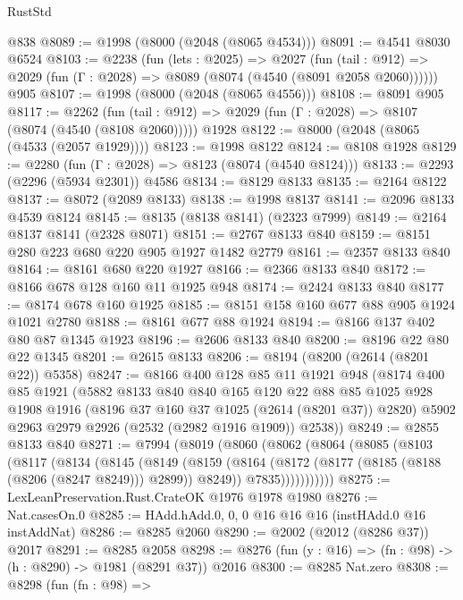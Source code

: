 \begin{lexlean}{RustStd}
\begin{coremodule}
    @838
@8089 := @1998 (@8000 (@2048 (@8065 @4534)))
@8091 := @4541 @8030 @6524
@8103 := @2238
    (fun (lets : @2025) =>
    @2027
      (fun (tail : @912) => @2029 (fun (Γ : @2028) => @8089 (@8074 (@4540 (@8091 @2058 @2060))))))
    @905
@8107 := @1998 (@8000 (@2048 (@8065 @4556)))
@8108 := @8091 @905
@8117 := @2262
    (fun (tail : @912) => @2029 (fun (Γ : @2028) => @8107 (@8074 (@4540 (@8108 @2060)))))
    @1928
@8122 := @8000 (@2048 (@8065 (@4533 (@2057 @1929))))
@8123 := @1998 @8122
@8124 := @8108 @1928
@8129 := @2280 (fun (Γ : @2028) => @8123 (@8074 (@4540 @8124)))
@8133 := @2293 (@2296 (@5934 @2301)) @4586
@8134 := @8129 @8133
@8135 := @2164 @8122
@8137 := @8072 (@2089 @8133)
@8138 := @1998 @8137
@8141 := @2096 @8133 @4539 @8124
@8145 := @8135 (@8138 @8141) (@2323 @7999)
@8149 := @2164 @8137 @8141 (@2328 @8071)
@8151 := @2767 @8133 @840
@8159 := @8151 @280 @223 @680 @220 @905 @1927 @1482 @2779
@8161 := @2357 @8133 @840
@8164 := @8161 @680 @220 @1927
@8166 := @2366 @8133 @840
@8172 := @8166 @678 @128 @160 @11 @1925 @948
@8174 := @2424 @8133 @840
@8177 := @8174 @678 @160 @1925
@8185 := @8151 @158 @160 @677 @88 @905 @1924 @1021 @2780
@8188 := @8161 @677 @88 @1924
@8194 := @8166 @137 @402 @80 @87 @1345 @1923
@8196 := @2606 @8133 @840
@8200 := @8196 @22 @80 @22 @1345
@8201 := @2615 @8133
@8206 := @8194 (@8200 (@2614 (@8201 @22)) @5358)
@8247 := @8166
    @400
    @128
    @85
    @11
    @1921
    @948
    (@8174
      @400
      @85
      @1921
      (@5882
        @8133
        @840
        @840
        @165
        @120
        @22
        @88
        @85
        @1025
        @928
        @1908
        @1916
        (@8196 @37 @160 @37 @1025 (@2614 (@8201 @37)) @2820)
        @5902
        @2963
        @2979
        @2926
        (@2532 (@2982 @1916 @1909))
        @2538))
@8249 := @2855 @8133 @840
@8271 := @7994
    (@8019
      (@8060
        (@8062
          (@8064
            (@8085
              (@8103
                (@8117
                  (@8134
                    (@8145
                      (@8149
                        (@8159
                          (@8164 (@8172 (@8177 (@8185 (@8188 (@8206 (@8247 @8249))) @2899)) @8249))
                          @7835)))))))))))
@8275 := LexLeanPreservation.Rust.CrateOK @1976 @1978 @1980
@8276 := Nat.casesOn.{0}
@8285 := HAdd.hAdd.{0, 0, 0} @16 @16 @16 (instHAdd.{0} @16 instAddNat)
@8286 := @8285 @2060
@8290 := @2002 (@2012 (@8286 @37)) @2017
@8291 := @8285 @2058
@8298 := @8276 (fun (y : @16) => (fn : @98) -> (h : @8290) -> @1981 (@8291 @37)) @2016
@8300 := @8285 Nat.zero
@8308 := @8298
    (fun (fn : @98) =>

\end{coremodule}
\end{lexlean}
